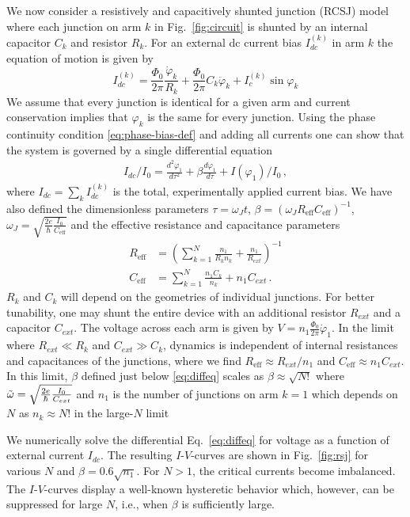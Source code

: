 \documentclass[aps,rsi,reprint,amsmath,amssymb,floatfix,longbibliography,superscriptaddress]{revtex4-1}
\begin{document}
We now consider a resistively and capacitively shunted junction (RCSJ) model where each junction on arm $k$ in Fig.~\ref{fig:circuit} is shunted by an internal capacitor $C_k$ and resistor $R_k$. For an external dc current bias $I^{(k)}_{dc}$ in arm $k$ the equation of motion is given by
\begin{equation}
    I^{(k)}_{dc}=\frac{\Phi_0}{2\pi}\frac{\dot \varphi_k}{R_k} + \frac{\Phi_0}{2\pi}C_k\ddot \varphi_k + I^{(k)}_c \sin\varphi_k
\end{equation} 
We assume that every junction is identical for a given arm and current conservation implies that $\varphi_k$ is the same for every junction. Using the phase continuity condition \eqref{eq:phase-bias-def} and adding all currents one can show that the system is governed by a single differential equation
\begin{align}
	I_{dc}/I_0 = \frac{d^2\varphi_1}{d\tau^2} + \beta
	\frac{d\varphi_1}{d\tau} + I(\varphi_1)/I_0  \,,
	\label{eq:diffeq}
\end{align}
where $I_{dc} = \sum_k I_{dc}^{(k)}$ is the total, experimentally applied current bias.
We have also defined the dimensionless parameters
$\tau = \omega_J t$,
$\beta = (\omega_J R_{\text{eff}}C_{\text{eff}})^{-1}$,
$\omega_J = \sqrt{\frac{2e}{\hbar}\frac{I_0}{C_{\text{eff}}}}$ and the effective resistance and capacitance parameters
\begin{align}
    R_{\text{eff}}&=\left(\sum_{k=1}^N\frac{n_1}{R_kn_k}+\frac{n_1}{R_{ext}}\right)^{-1} \\ C_{\text{eff}}&=\sum_{k=1}^N\frac{n_1C_k}{n_k}+n_1C_{ext} \,.
\end{align} 
$R_k$ and $C_k$ will depend on the geometries of individual junctions. For better tunability, one may shunt the entire device with an additional resistor $R_{ext}$ and a capacitor $C_{ext}$. The voltage across each arm is given by $V = n_1\frac{\Phi_0}{2\pi}\dot\varphi_1$. In the limit where $R_{ext}\ll R_k$ and $C_{ext} \gg C_k$, dynamics is independent of internal resistances and capacitances of the junctions, where we find $R_{\text{eff}}\approx R_{ext}/{n_1}$ and $C_{\text{eff}}\approx n_1C_{ext}$. In this limit, $\beta$ defined just below \ref{eq:diffeq} scales as $ \beta \approx \sqrt{N!}$
where $\Tilde{\omega} = \sqrt{\frac{2e}{\hbar}\frac{I_0}{C_{ext}}}$ and $n_1$ is the number of junctions on arm $k=1$ which depends on $N$ as $n_k \approx N!$ in the large-$N$ limit

We numerically solve the differential Eq.~\eqref{eq:diffeq} for voltage as a
function of external current $I_{dc}$. The resulting $I$-$V$-curves are shown in
Fig.~\ref{fig:rsj} for various $N$ and $\beta=0.6\sqrt{n_1}$. For $N>1$, the
critical currents become imbalanced. The $I$-$V$-curves display a well-known hysteretic
behavior which, however, can be suppressed for large $N$, i.e., when $\beta$ is sufficiently large.
\end{document}
